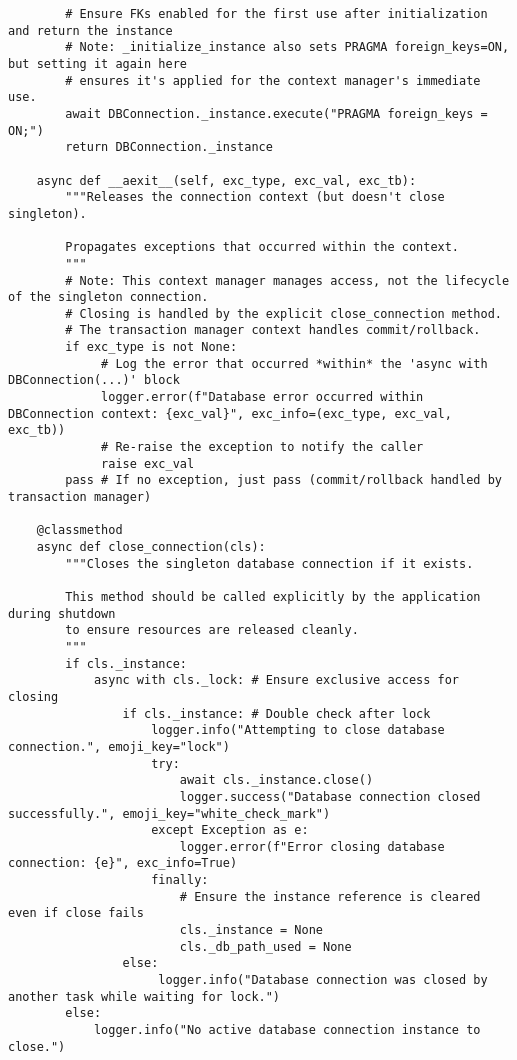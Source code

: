 \documentclass[12pt,a4paper]{article}
\begin{document}
\begin{pageablecode}
\begin{verbatim}
        # Ensure FKs enabled for the first use after initialization and return the instance
        # Note: _initialize_instance also sets PRAGMA foreign_keys=ON, but setting it again here
        # ensures it's applied for the context manager's immediate use.
        await DBConnection._instance.execute("PRAGMA foreign_keys = ON;")
        return DBConnection._instance

    async def __aexit__(self, exc_type, exc_val, exc_tb):
        """Releases the connection context (but doesn't close singleton).

        Propagates exceptions that occurred within the context.
        """
        # Note: This context manager manages access, not the lifecycle of the singleton connection.
        # Closing is handled by the explicit close_connection method.
        # The transaction manager context handles commit/rollback.
        if exc_type is not None:
             # Log the error that occurred *within* the 'async with DBConnection(...)' block
             logger.error(f"Database error occurred within DBConnection context: {exc_val}", exc_info=(exc_type, exc_val, exc_tb))
             # Re-raise the exception to notify the caller
             raise exc_val
        pass # If no exception, just pass (commit/rollback handled by transaction manager)

    @classmethod
    async def close_connection(cls):
        """Closes the singleton database connection if it exists.

        This method should be called explicitly by the application during shutdown
        to ensure resources are released cleanly.
        """
        if cls._instance:
            async with cls._lock: # Ensure exclusive access for closing
                if cls._instance: # Double check after lock
                    logger.info("Attempting to close database connection.", emoji_key="lock")
                    try:
                        await cls._instance.close()
                        logger.success("Database connection closed successfully.", emoji_key="white_check_mark")
                    except Exception as e:
                        logger.error(f"Error closing database connection: {e}", exc_info=True)
                    finally:
                        # Ensure the instance reference is cleared even if close fails
                        cls._instance = None
                        cls._db_path_used = None
                else:
                     logger.info("Database connection was closed by another task while waiting for lock.")
        else:
            logger.info("No active database connection instance to close.")


\end{verbatim}
\end{pageablecode}
\end{document}
